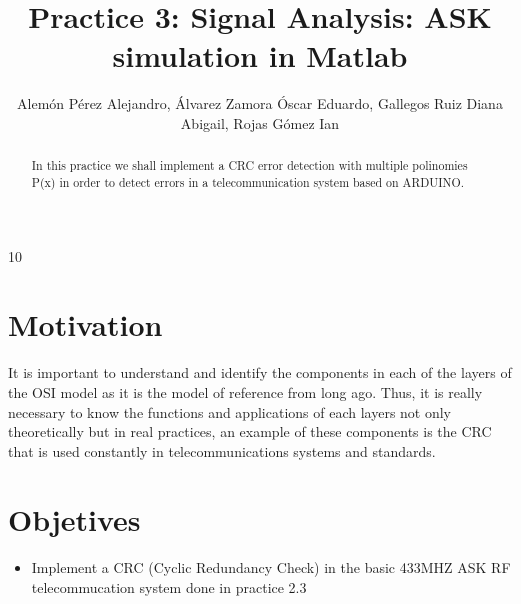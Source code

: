\documentclass{IEEEtran}
\title{Practice 3: Signal Analysis: ASK simulation in Matlab}
\author{Alemón Pérez Alejandro, Álvarez Zamora Óscar Eduardo, Gallegos Ruiz Diana Abigail, Rojas Gómez Ian }
\begin{document}
	
	\maketitle
	\begin{abstract}
	In this practice we shall implement a CRC error detection with multiple polinomies P(x) in order to detect errors in a telecommunication system based on ARDUINO.
	\end{abstract}10
	\section{Motivation}	
		It is important to understand and identify the components in each of the layers of the OSI model as it is the model of reference from long ago. Thus, it is really necessary to know the functions and applications of each layers not only theoretically but in real practices, an example of these components is the CRC that is used constantly in telecommunications systems and standards.
	
	\section{Objetives}
		\begin{itemize}
			
			\item 	Implement a CRC (Cyclic Redundancy Check) in the basic 433MHZ ASK RF telecommucation system done in practice 2.3
			
		\end{itemize}

	
	
	
	\cite{stallings2000}
	\cite{tanenbaumwetherall2014}
	\cite{teleradio_2020}
	
	
	
	
	
	
\end{document}
